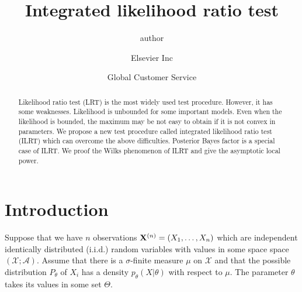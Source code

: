 \documentclass[3p]{elsarticle}
\theoremstyle{plain}
\theoremstyle{definition}
\theoremstyle{remark}
\begin{document}
\begin{frontmatter}

\title{Integrated likelihood ratio test}

\author{author }
\address{Radarweg 29, Amsterdam}

\author[mymainaddress,mysecondaryaddress]{Elsevier Inc}

\author[mysecondaryaddress]{Global Customer Service}

\address[mymainaddress]{1600 John F Kennedy Boulevard, Philadelphia}
\address[mysecondaryaddress]{360 Park Avenue South, New York}

\begin{abstract}

    Likelihood ratio test (LRT) is the most widely used test procedure. However, it has some weaknesses. Likelihood is unbounded for some important models. Even when the likelihood is bounded, the maximum may be not easy to obtain if it is not convex in parameters. We propose a new test procedure called integrated likelihood ratio test (ILRT) which can overcome the above difficulties. Posterior Bayes factor is a special case of ILRT\@. We proof the Wilks phenomenon of ILRT and give the asymptotic local power.
\end{abstract}

\begin{keyword}
\end{keyword}

\end{frontmatter}


\section{Introduction}
Suppose that we have $n$ observations $\mathbf{X}^{(n)}=(X_1,\ldots,X_n)$ which are independent identically distributed (i.i.d.) random variables with values in some space space $(\mathcal{X};\mathscr{A})$.
Assume that there is a $\sigma$-finite measure $\mu$ on $\mathcal{X}$ and that the  possible distribution $P_\theta$ of $X_i$ has a density $p_\theta(X|\theta)$ with respect to $\mu$. The parameter $\theta$ takes its values in some set $\Theta$.
\end{document}
